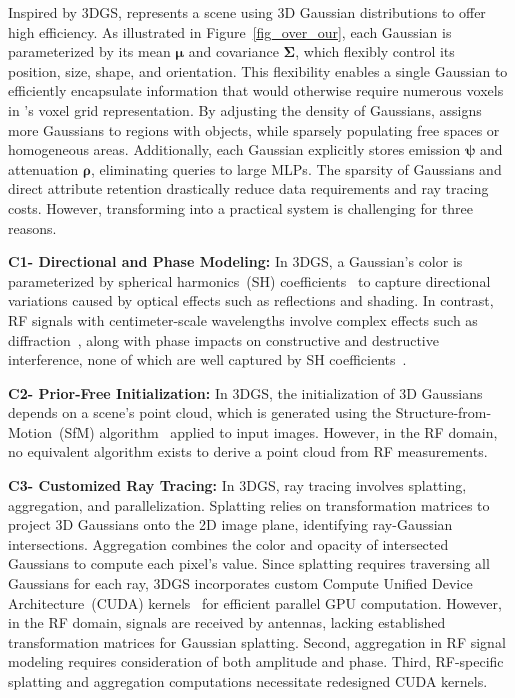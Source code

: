 Inspired by 3DGS, \ourSystem represents a scene using 3D Gaussian distributions to offer high efficiency.
As illustrated in Figure~\ref{fig_over_our}, each Gaussian is parameterized by its mean \(\boldsymbol{\mu}\) and covariance \(\boldsymbol{\Sigma}\), which flexibly control its position, size, shape, and orientation.  
This flexibility enables a single Gaussian to efficiently encapsulate information that would otherwise require numerous voxels in \nerft's voxel grid representation.  
By adjusting the density of Gaussians, \ourSystem assigns more Gaussians to regions with objects, while sparsely populating free spaces or homogeneous areas.  
Additionally, each Gaussian explicitly stores emission \(\boldsymbol{\psi}\) and attenuation \(\boldsymbol{\rho}\), eliminating queries to large MLPs.
The sparsity of Gaussians and direct attribute retention drastically reduce data requirements and ray tracing costs.
However, transforming \ourSystem into a practical system is challenging for three reasons.

\textbf{C1- Directional and Phase Modeling:}
In 3DGS, a Gaussian's color is parameterized by spherical harmonics~(SH) coefficients~\cite{schonefeld2005spherical, kerbl20233d} to capture directional variations caused by optical effects such as reflections and shading. 
In contrast, RF signals with centimeter-scale wavelengths involve complex effects such as diffraction~\cite{1451581}, along with phase impacts on constructive and destructive interference, none of which are well captured by SH coefficients~\cite{schonefeld2005spherical, schmitz2012using}.


\textbf{C2- Prior-Free Initialization:}
In 3DGS, the initialization of 3D Gaussians depends on a scene's point cloud, which is generated using the Structure-from-Motion~(SfM) algorithm~\cite{snavely2006photo} applied to input images.  
However, in the RF domain, no equivalent algorithm exists to derive a point cloud from RF measurements.



\textbf{C3- Customized Ray Tracing:}  
In 3DGS, ray tracing involves splatting, aggregation, and parallelization.  
Splatting relies on transformation matrices to project 3D Gaussians onto the 2D image plane, identifying ray-Gaussian intersections.  
Aggregation combines the color and opacity of intersected Gaussians to compute each pixel's value.
Since splatting requires traversing all Gaussians for each ray, 3DGS incorporates custom Compute Unified Device Architecture~(CUDA) kernels~\cite{cuda_programming} for efficient parallel GPU computation. 
However, in the RF domain, signals are received by antennas, lacking established transformation matrices for Gaussian splatting.  
Second, aggregation in RF signal modeling requires consideration of both amplitude and phase.  
Third, RF-specific splatting and aggregation computations necessitate redesigned CUDA kernels.



